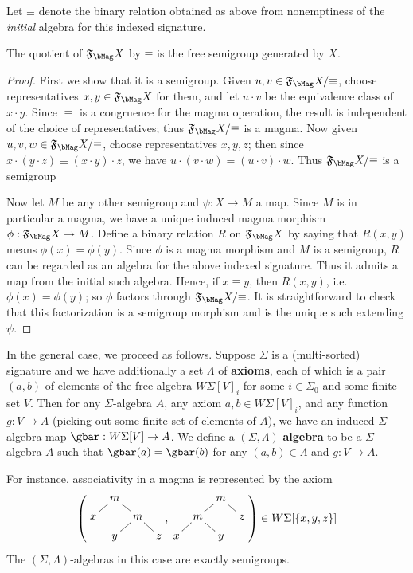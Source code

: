 \documentclass{book}
\def\sig{\Sigma}
\def\axes{\Lambda}
\def\equivsym{\mathord{\equiv}}
\newcommand{\F}[1]{\mathfrak{F}_{#1}}
\begin{document}
Let $\equivsym$ denote the binary relation obtained as above from nonemptiness of the \emph{initial} algebra for this indexed signature.

\begin{thm}\label{thm:free-monoid}
  The quotient of $\F\bMag X$ by $\equivsym$ is the free semigroup generated by $X$.
\end{thm}
\begin{proof}
  First we show that it is a semigroup.
  Given $u,v\in\F\bMag X/\equivsym$, choose representatives $x,y\in\F\bMag X$ for them, and let $u\cdot v$ be the equivalence class of $x\cdot y$.
  Since $\equiv$ is a congruence for the magma operation, the result is independent of the choice of representatives; thus $\F\bMag X/\equivsym$ is a magma.
  Now given $u,v,w \in \F\bMag X/\equivsym$, choose representatives $x,y,z$; then since $x\cdot (y\cdot z)\equiv (x\cdot y)\cdot z$, we have $u\cdot (v\cdot w) =  (u\cdot v)\cdot w$.
  Thus $\F\bMag X/\equivsym$ is a semigroup

  Now let $M$ be any other semigroup and $\psi:X\to M$ a map.
  Since $M$ is in particular a magma, we have a unique induced magma morphism $\phi : \F\bMag X\to M$.
  Define a binary relation $R$ on $\F\bMag X$ by saying that $R(x,y)$ means $\phi(x)=\phi(y)$.
  Since $\phi$ is a magma morphism and $M$ is a semigroup, $R$ can be regarded as an algebra for the above indexed signature.
  Thus it admits a map from the initial such algebra.
  Hence, if $x\equiv y$, then $R(x,y)$, i.e.\ $\phi(x)=\phi(y)$; so $\phi$ factors through $\F\bMag X/\equivsym$.
  It is straightforward to check that this factorization is a semigroup morphism and is the unique such extending $\psi$.
\end{proof}

In the general case, we proceed as follows.
Suppose $\sig$ is a (multi-sorted) signature and we have additionally a set $\axes$ of \textbf{axioms}, each of which is a pair $(a,b)$ of elements of the free algebra $W\sig[V]_i$ for some $i\in\sig_0$ and some finite set $V$.
Then for any $\sig$-algebra $A$, any axiom $a,b\in W\sig[V]_i$, and any function $g:V\to A$ (picking out some finite set of elements of $A$), we have an induced $\sig$-algebra map $\gbar:W\sig[V]\to A$.
We define a $(\sig,\axes)$-\textbf{algebra} to be a $\sig$-algebra $A$ such that $\gbar(a)=\gbar(b)$ for any $(a,b)\in\axes$ and $g:V\to A$.

For instance, associativity in a magma is represented by the axiom
\[ \left(
  \vcenter{\xymatrix@-1.5pc{ & m \ar@{-}[dl] \ar@{-}[dr] \\ x && m \ar@{-}[dl] \ar@{-}[dr] \\ & y && z }},
  \vcenter{\xymatrix@-1.5pc{ && m \ar@{-}[dl] \ar@{-}[dr] \\ & m \ar@{-}[dl] \ar@{-}[dr] && z \\ x && y }}
\right)
\in W\sig[\{x,y,z\}]
\]
The $(\sig,\axes)$-algebras in this case are exactly semigroups.
\end{document}

